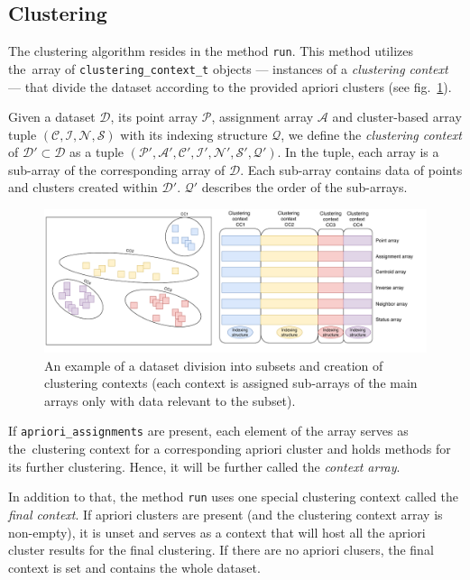 \subsection{Clustering}
The clustering algorithm resides in the method \texttt{run}. This method utilizes the~array of \texttt{clustering\_context\_t} objects --- instances of a \emph{clustering context} --- that divide the dataset according to the provided apriori clusters (see fig.~\ref{fig03:clust_ctx}).

\begin{defn}
	Given a dataset $\mathcal{D}$, its point array $\mathcal{P}$, assignment array $\mathcal{A}$ and cluster-based array tuple $(\mathcal{C},\mathcal{I},\mathcal{N},\mathcal{S})$ with its indexing structure $\mathcal{Q}$, we define the \emph{clustering context} of $\mathcal{D}' \subset \mathcal{D}$ as a tuple $(\mathcal{P'},\mathcal{A'},\mathcal{C'},\mathcal{I'},\mathcal{N'},\mathcal{S'},\mathcal{Q}')$. In the tuple, each array is a sub-array of the corresponding array of $\mathcal{D}$. Each sub-array contains data of points and clusters created within $\mathcal{D}'$. $\mathcal{Q}'$ describes the order of the sub-arrays.
	\label{def03:context}
\end{defn}

\begin{figure}\centering
	\includegraphics[width=\linewidth]{img/clustering_context}
	\caption{An example of a dataset division into subsets and creation of clustering contexts (each context is assigned sub-arrays of the main arrays only with data relevant to the subset).}
	\label{fig03:clust_ctx}
\end{figure}

 If \texttt{apriori\_assignments} are present, each element of the array serves as the~clustering context for a corresponding apriori cluster and holds methods for its further clustering. Hence, it will be further called the \emph{context array}. 

In addition to that, the method \texttt{run} uses one special clustering context called the \emph{final context}. If apriori clusters are present (and the clustering context array is non-empty), it is unset and serves as a context that will host all the apriori cluster results for the final clustering. If there are no apriori clusers, the final context is set and contains the whole dataset.

